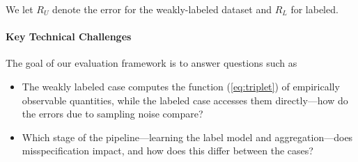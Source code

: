 We let $R_U$ denote the error for the weakly-labeled dataset and $R_L$ for labeled.

\paragraph{Key Technical Challenges}
The goal of our evaluation framework is to answer questions such as
\begin{itemize}
    \item The weakly labeled case computes the function (\ref{eq:triplet}) of empirically observable quantities, while the labeled case accesses them directly---how do the errors due to sampling noise compare? 
    \item Which stage of the pipeline---learning the label model and aggregation---does misspecification impact, and how does this differ between the cases?
\end{itemize}







